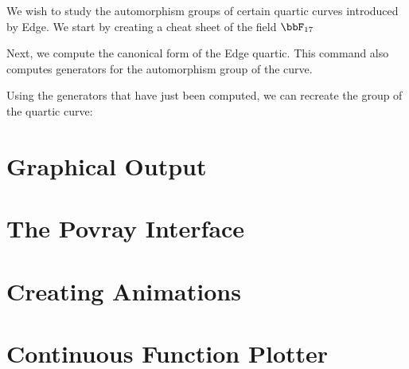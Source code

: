  
We wish to study the automorphism groups of certain quartic curves introduced by Edge.
We start by creating a cheat sheet of the field $\bbF_{17}$
{\tt

}
Next, we compute the canonical form of the Edge quartic. 
This command also computes generators for the automorphism group of the curve.
{\tt

}
Using the generators that have just been computed, 
we can recreate the group of the quartic curve:
{\tt

}


\section{Graphical Output}
\label{sec:draw}






\bigskip

\clearpage





\section{The Povray Interface}
\label{sec:povray}







\bigskip
\clearpage




\section{Creating Animations}
\label{sec:animations}






\bigskip

\clearpage






\section{Continuous Function Plotter}
\label{sec:function:plotter}






\bigskip

